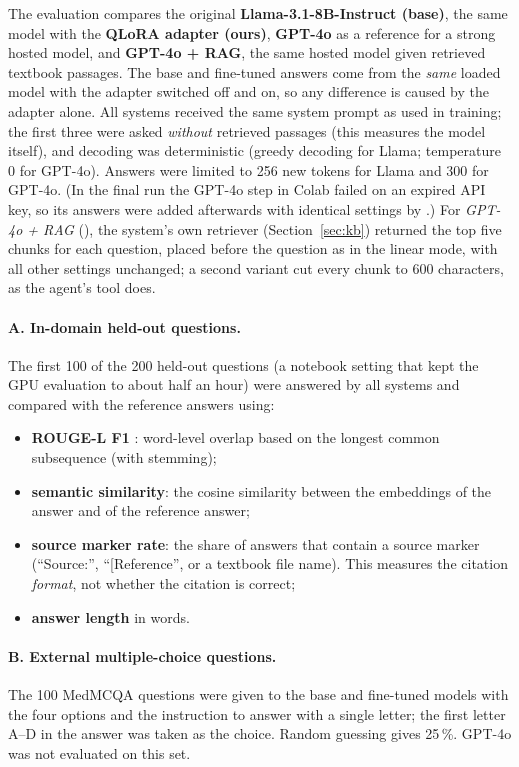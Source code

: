 The evaluation compares the original \textbf{Llama-3.1-8B-Instruct (base)}, the same model with the \textbf{QLoRA adapter (ours)}, \textbf{GPT-4o} as a reference for a strong hosted model, and \textbf{GPT-4o + RAG}, the same hosted model given retrieved textbook passages. The base and fine-tuned answers come from the \emph{same} loaded model with the adapter switched off and on, so any difference is caused by the adapter alone. All systems received the same system prompt as used in training; the first three were asked \emph{without} retrieved passages (this measures the model itself), and decoding was deterministic (greedy decoding for Llama; temperature 0 for GPT-4o). Answers were limited to 256 new tokens for Llama and 300 for GPT-4o. (In the final run the GPT-4o step in Colab failed on an expired API key, so its answers were added afterwards with identical settings by .) For \emph{GPT-4o + RAG} (), the system's own retriever (Section~\ref{sec:kb}) returned the top five chunks for each question, placed before the question as in the linear mode, with all other settings unchanged; a second variant cut every chunk to 600 characters, as the agent's tool does.

\paragraph{A. In-domain held-out questions.} The first 100 of the 200 held-out questions (a notebook setting that kept the GPU evaluation to about half an hour) were answered by all systems and compared with the reference answers using:
\begin{itemize}
  \item \textbf{ROUGE-L F1} \cite{lin2004rouge}: word-level overlap based on the longest common subsequence (with stemming);
  \item \textbf{semantic similarity}: the cosine similarity between the  embeddings of the answer and of the reference answer;
  \item \textbf{source marker rate}: the share of answers that contain a source marker (``Source:'', ``[Reference'', or a textbook file name). This measures the citation \emph{format}, not whether the citation is correct;
  \item \textbf{answer length} in words.
\end{itemize}

\paragraph{B. External multiple-choice questions.} The 100 MedMCQA questions were given to the base and fine-tuned models with the four options and the instruction to answer with a single letter; the first letter A--D in the answer was taken as the choice. Random guessing gives 25\,\%. GPT-4o was not evaluated on this set.

